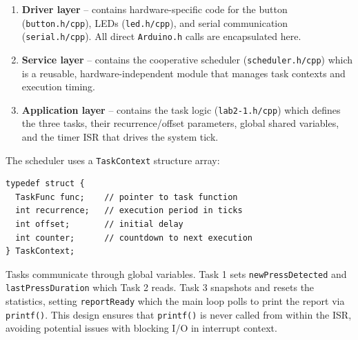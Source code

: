 \begin{enumerate}
  \item \textbf{Driver layer} -- contains hardware-specific code for the button
    (\texttt{button.h/cpp}), LEDs (\texttt{led.h/cpp}), and serial communication
    (\texttt{serial.h/cpp}). All direct \texttt{Arduino.h} calls are encapsulated here.
  \item \textbf{Service layer} -- contains the cooperative scheduler
    (\texttt{scheduler.h/cpp}) which is a reusable, hardware-independent module
    that manages task contexts and execution timing.
  \item \textbf{Application layer} -- contains the task logic (\texttt{lab2-1.h/cpp})
    which defines the three tasks, their recurrence/offset parameters, global shared
    variables, and the timer ISR that drives the system tick.
\end{enumerate}

The scheduler uses a \texttt{TaskContext} structure array:
\begin{lstlisting}
typedef struct {
  TaskFunc func;    // pointer to task function
  int recurrence;   // execution period in ticks
  int offset;       // initial delay
  int counter;      // countdown to next execution
} TaskContext;
\end{lstlisting}

Tasks communicate through global variables. Task 1 sets \texttt{newPressDetected} and
\texttt{lastPressDuration} which Task 2 reads. Task 3 snapshots and resets the statistics,
setting \texttt{reportReady} which the main loop polls to print the report via \texttt{printf()}.
This design ensures that \texttt{printf()} is never called from within the ISR, avoiding
potential issues with blocking I/O in interrupt context.
